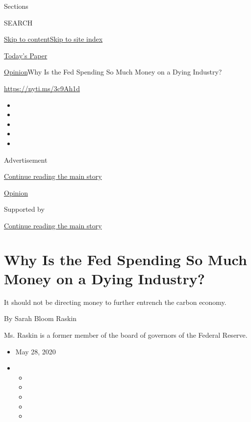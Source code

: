 Sections

SEARCH

\protect\hyperlink{site-content}{Skip to
content}\protect\hyperlink{site-index}{Skip to site index}

\href{https://myaccount.nytimes3xbfgragh.onion/auth/login?response_type=cookie\&client_id=vi}{}

\href{https://www.nytimes3xbfgragh.onion/section/todayspaper}{Today's
Paper}

\href{/section/opinion}{Opinion}\textbar{}Why Is the Fed Spending So
Much Money on a Dying Industry?

\url{https://nyti.ms/3c9Ah1d}

\begin{itemize}
\item
\item
\item
\item
\item
\end{itemize}

Advertisement

\protect\hyperlink{after-top}{Continue reading the main story}

\href{/section/opinion}{Opinion}

Supported by

\protect\hyperlink{after-sponsor}{Continue reading the main story}

\hypertarget{why-is-the-fed-spending-so-much-money-on-a-dying-industry}{%
\section{Why Is the Fed Spending So Much Money on a Dying
Industry?}\label{why-is-the-fed-spending-so-much-money-on-a-dying-industry}}

It should not be directing money to further entrench the carbon economy.

By Sarah Bloom Raskin

Ms. Raskin is a former member of the board of governors of the Federal
Reserve.

\begin{itemize}
\item
  May 28, 2020
\item
  \begin{itemize}
  \item
  \item
  \item
  \item
  \item
  \end{itemize}
\end{itemize}

